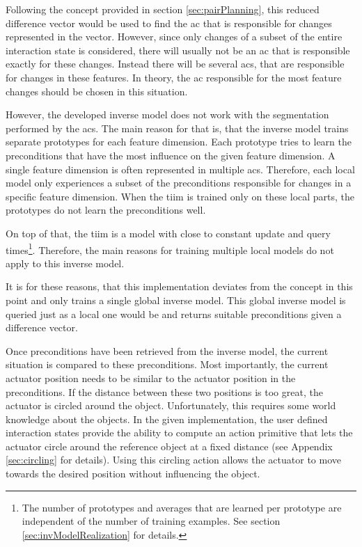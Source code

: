 Following the concept provided in section \ref{sec:pairPlanning}, this reduced difference vector would be used to find the \gls{ac} that is responsible for changes represented in the vector.
However, since only changes of a subset of the entire interaction state is considered, there will usually not be an \gls{ac} that is responsible exactly for these changes. 
Instead there will be several \glspl{ac}, that are responsible for changes in these features. In theory, the \gls{ac} responsible for the most feature changes should be chosen in this situation. 

However, the developed inverse model does not work with the segmentation performed by the \glspl{ac}. The main reason for that is, that the inverse model trains separate prototypes for each feature dimension.
Each prototype tries to learn the preconditions that have the most influence on the given feature dimension. A single feature dimension is often represented in multiple \glspl{ac}. Therefore, each local model only experiences a subset of the preconditions responsible for changes in a specific feature dimension. When the \gls{tiim} is trained only on these local parts, the prototypes do not learn the preconditions well.

On top of that, the \gls{tiim} is a model with close to constant update and query times\footnote{The number of prototypes and averages that are learned per prototype are independent of the number of training examples. See section \ref{sec:invModelRealization} for details.}. Therefore, the main reasons for training multiple local models do not apply to this inverse model.

It is for these reasons, that this implementation deviates from the concept in this point and only trains a single global inverse model.
This global inverse model is queried just as a local one would be and returns suitable preconditions given a difference vector.

Once preconditions have been retrieved from the inverse model, the current situation is compared to these preconditions. Most importantly, the current actuator position needs to be similar to the actuator position in the preconditions. If the distance between these two positions is too great, the actuator is circled around the object. Unfortunately, this requires some world knowledge about the objects. In the given implementation, the user defined interaction states provide the ability to compute an action primitive that lets the actuator circle around the reference object at a fixed distance (see Appendix \ref{sec:circling} for details). 
Using this circling action allows the actuator to move towards the desired position without influencing the object.


